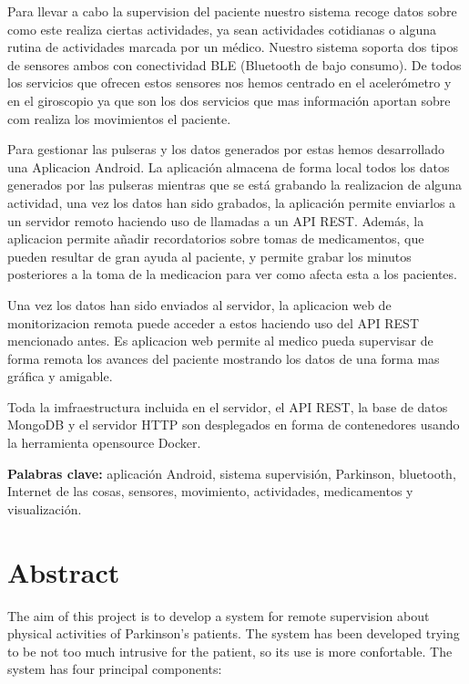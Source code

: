 \documentclass[11pt,spanish]{article}
\newcommand\blankpage{%
    \null
    \thispagestyle{empty}%
    \addtocounter{page}{-1}%
    \newpage}
\begin{document}
Para llevar a cabo la supervision del paciente nuestro sistema recoge datos sobre como este realiza ciertas actividades, ya sean actividades cotidianas o alguna rutina de actividades marcada por un médico. Nuestro sistema soporta dos tipos de sensores ambos con conectividad BLE (Bluetooth de bajo consumo). De todos los servicios que ofrecen estos sensores nos hemos centrado en el acelerómetro y en el giroscopio ya que son los dos servicios que mas información aportan sobre com realiza los movimientos el paciente.
\newline

Para gestionar las pulseras y los datos generados por estas hemos desarrollado una Aplicacion Android. La aplicación almacena de forma local todos los datos generados por las pulseras mientras que se está grabando la realizacion de alguna actividad, una vez los datos han sido grabados, la aplicación permite enviarlos a un servidor remoto haciendo uso de llamadas a un API REST. Además, la aplicacion permite añadir recordatorios sobre tomas de medicamentos, que pueden resultar de gran ayuda al paciente, y permite grabar los minutos posteriores a la toma de la medicacion para ver como afecta esta a los pacientes.
\newline

Una vez los datos han sido enviados al servidor, la aplicacion web de monitorizacion remota puede acceder a estos haciendo uso del API REST mencionado antes. Es aplicacion web permite al medico pueda supervisar de forma remota los avances del paciente mostrando los datos de una forma mas gráfica y amigable.
\newline

Toda la imfraestructura incluida en el servidor, el API REST, la base de datos MongoDB y el servidor HTTP son desplegados en forma de contenedores usando la herramienta opensource Docker.
\newline

{\bf Palabras clave:} aplicación Android, sistema supervisión, Parkinson, bluetooth, Internet de las cosas, sensores, movimiento, actividades, medicamentos y visualización.
\newpage

\blankpage

\section*{Abstract}
The aim of this project is to develop a system for remote supervision about physical activities of Parkinson's patients. The system has been developed trying to be not too much intrusive for the patient, so its use is more confortable. The system has four principal components:
\end{document}
